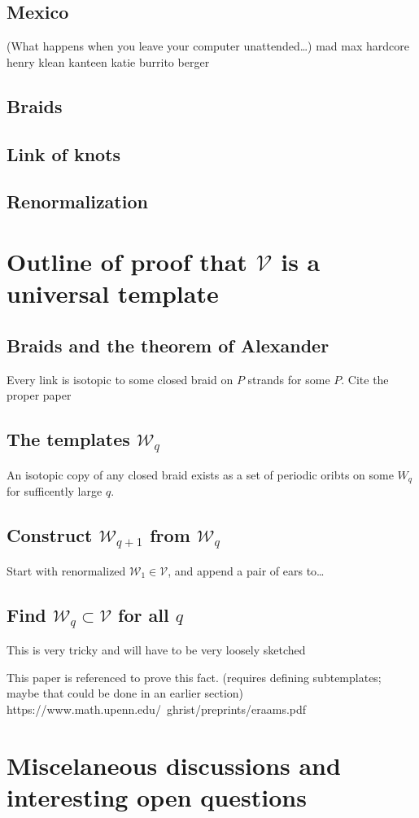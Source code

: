 \documentclass[11pt]{article}
\newcommand{\W}{\mathcal{W}}
\newcommand{\V}{\mathcal{V}}
\theoremstyle{plain}
\theoremstyle{definition}
\begin{document}
\subsection{Mexico}
(What happens when you leave your computer unattended\dots)
mad max
hardcore henry
klean kanteen katie
burrito berger

\subsection{Braids}

\subsection{Link of knots}

\subsection{Renormalization}

\section{Outline of proof that $\mathcal{V}$ is a universal template}

\subsection{Braids and the theorem of Alexander}

Every link is isotopic to some closed braid on $P$ strands for some $P$. Cite the proper paper

\subsection{The templates $\W_q$}

An isotopic copy of any closed braid exists as a set of periodic oribts on some $W_q$ for sufficently large $q$.

\subsection{Construct $\W_{q+1}$ from $\W_q$}

Start with renormalized $\W_1 \in \V$, and append a pair of ears to\dots

\subsection{Find $\W_q \subset \V$ for all $q$}

This is very tricky and will have to be very loosely sketched

This paper is referenced to prove this fact. (requires defining subtemplates; maybe that could be done in an earlier section)
https://www.math.upenn.edu/~ghrist/preprints/eraams.pdf





\section{Miscelaneous discussions and interesting open questions}
\end{document}
